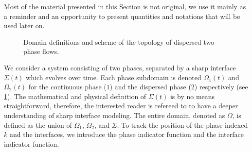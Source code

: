 Most of the material presented in this Section is not original, we use it mainly as
a reminder and an opportunity to present quantities and notations that will be
used later on.
\begin{figure}[h!]
    \centering
    \caption{Domain definitions and scheme of the topology of dispersed two-phase flows.}
    \label{fig:Scheme}
\end{figure}
We consider a system consisting of two phases, separated by a sharp interface $\Sigma(t)$ which evolves over time. 
Each phase subdomain is denoted $\Omega_1(t)$ and $\Omega_2(t)$ for the continuous phase ($1$) and the dispersed phase ($2$) respectively (see \ref{fig:Scheme}). 
The mathematical and physical definition of $\Sigma(t)$ is by no means straightforward, therefore, the interested reader is refereed to \cite{bothe2022sharp} to have a deeper understanding of sharp interface modeling. 
The entire domain, denoted as $\Omega$, is defined as the union of $\Omega_1$, $\Omega_2$, and $\Sigma$.
To track the position of the phase indexed $k$ and the interfaces, we introduce the phase indicator function and the interface indicator function, 
